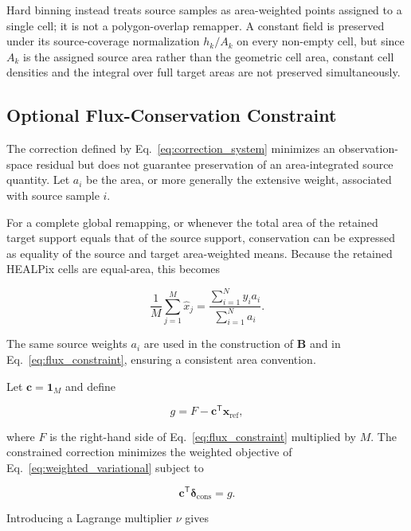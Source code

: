 \documentclass[journal]{IEEEtran}
\newcommand{\healpix}{HEALPix\xspace}
\begin{document}
Hard binning instead treats source samples as area-weighted points
assigned to a single cell; it is not a polygon-overlap remapper. A
constant field is preserved under its source-coverage
normalization $h_k/A_k$ on every non-empty cell, but since $A_k$
is the assigned source area rather than the geometric cell area,
constant cell densities and the integral over full target areas
are not preserved simultaneously.


\subsection{Optional Flux-Conservation Constraint}
\label{sec:conservative_constraint}

The correction defined by Eq.~\eqref{eq:correction_system}
minimizes an observation-space residual but does not guarantee
preservation of an area-integrated source quantity. Let $a_i$ be
the area, or more generally the extensive weight, associated with
source sample $i$.

For a complete global remapping, or whenever the total area of the
retained target support equals that of the source support,
conservation can be expressed as equality of the source and target
area-weighted means. Because the retained \healpix cells are
equal-area, this becomes

\begin{equation}
\frac{1}{M}\sum_{j=1}^{M}\widehat x_j
=
\frac{\sum_{i=1}^{N}y_i a_i}
     {\sum_{i=1}^{N}a_i}.
\label{eq:flux_constraint}
\end{equation}

The same source weights $a_i$ are used in the construction of
$\mathbf B$ and in Eq.~\eqref{eq:flux_constraint}, ensuring a
consistent area convention.

Let $\mathbf c=\mathbf 1_M$ and define

\begin{equation}
g
=
F-\mathbf c^{\mathsf T}\mathbf x_{\mathrm{ref}},
\end{equation}

where $F$ is the right-hand side of
Eq.~\eqref{eq:flux_constraint} multiplied by $M$. The constrained
correction minimizes the weighted objective of
Eq.~\eqref{eq:weighted_variational} subject to

\begin{equation}
\mathbf c^{\mathsf T}\boldsymbol\delta_{\mathrm{cons}}=g.
\end{equation}

Introducing a Lagrange multiplier $\nu$ gives
\end{document}
